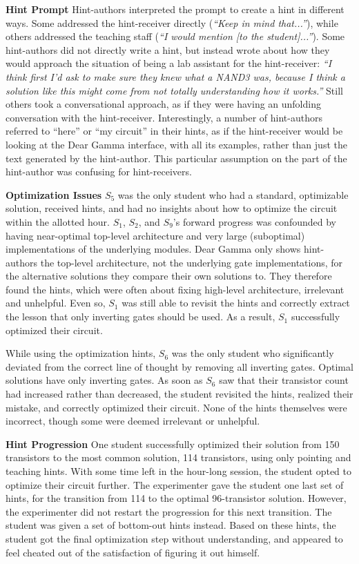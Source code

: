 {\bf Hint Prompt} Hint-authors interpreted the prompt to create a hint in different ways. Some addressed the hint-receiver directly ({\it ``Keep in mind that...''}), while others addressed the teaching staff ({\it ``I would mention [to the student]...''}). Some hint-authors did not directly write a hint, but instead wrote about how they would approach the situation of being a lab assistant for the hint-receiver: {\it ``I think first I'd ask to make sure they knew what a NAND3 was, because I think a solution like this might come from not totally understanding how it works.''} Still others took a conversational approach, as if they were having an unfolding conversation with the hint-receiver. Interestingly, a number of hint-authors referred to ``here'' or ``my circuit'' in their hints, as if the hint-receiver would be looking at the Dear Gamma interface, with all its examples, rather than just the text generated by the hint-author. This particular assumption on the part of the hint-author was confusing for hint-receivers.

{\bf Optimization Issues} $S_5$ was the only student who had a standard, optimizable solution, received hints, and had no insights about how to optimize the circuit within the allotted hour. $S_1$, $S_2$, and $S_9$'s forward progress was confounded by having near-optimal top-level architecture and very large (suboptimal) implementations of the underlying modules. Dear Gamma only shows hint-authors the top-level architecture, not the underlying gate implementations, for the alternative solutions they compare their own solutions to. They therefore found the hints, which were often about fixing high-level architecture, irrelevant and unhelpful. Even so, $S_1$ was still able to revisit the hints and correctly extract the lesson that only inverting gates should be used. As a result, $S_1$ successfully optimized their circuit.

While using the optimization hints, $S_6$ was the only student who significantly deviated from the correct line of thought by removing all inverting gates. Optimal solutions have only inverting gates. As soon as $S_6$ saw that their transistor count had increased rather than decreased, the student revisited the hints, realized their mistake, and correctly optimized their circuit. None of the hints themselves were incorrect, though some were deemed irrelevant or unhelpful.

{\bf Hint Progression} One student successfully optimized their solution from 150 transistors to the most common solution, 114 transistors, using only pointing and teaching hints. With some time left in the hour-long session, the student opted to optimize their circuit further. The experimenter gave the student one last set of hints, for the transition from 114 to the optimal 96-transistor solution. However, the experimenter did not restart the progression for this next transition. The student was given a set of bottom-out hints instead. Based on these hints, the student got the final optimization step without understanding, and appeared to feel cheated out of the satisfaction of figuring it out himself. 

